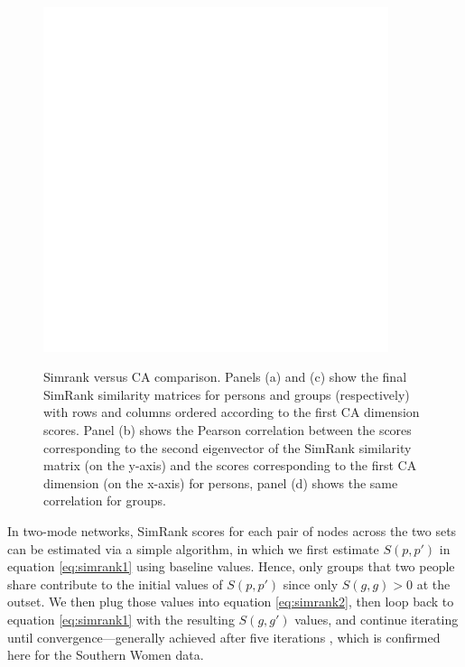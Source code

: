 \documentclass[a4paper,fleqn]{cas-sc}
\begin{document}
\begin{figure}
    \captionsetup[subfigure]{font=footnotesize,labelfont=footnotesize}
    \centering
        \includegraphics[width=0.9\textwidth]{Plots/simrank-v-ca.png}
            \label{fig:sim-v-ca}
    \caption{Simrank versus CA comparison. Panels (a) and (c) show the final SimRank similarity matrices for persons and groups (respectively) with rows and columns ordered according to the first CA dimension scores.  Panel (b) shows the Pearson correlation between the scores corresponding to the second eigenvector of the SimRank similarity matrix (on the y-axis) and the scores corresponding to the first CA dimension (on the x-axis) for persons, panel (d) shows the same correlation for groups.}
    \label{fig:simrank}
\end{figure}

In two-mode networks, SimRank scores for each pair of nodes across the two sets can be estimated via a simple algorithm, in which we first estimate $S(p, p')$ in equation \ref{eq:simrank1} using baseline values. Hence, only groups that two people share contribute to the initial values of $S(p, p')$ since only $S(g, g)>0$ at the outset. We then plug those values into equation \ref{eq:simrank2}, then loop back to equation \ref{eq:simrank1} with the resulting $S(g, g')$ values, and continue iterating until convergence---generally achieved after five iterations \citep{jeh2002simrank}, which is confirmed here for the Southern Women data. 
\end{document}
